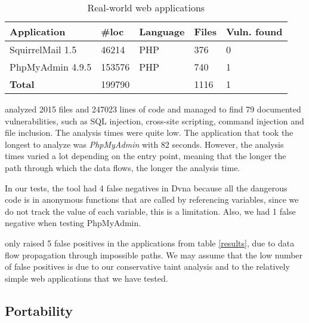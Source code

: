 \begin{table*}[htbp]
    \caption{Real-world web applications}
    \begin{center}
        \begin{tabular}{|l|| l | l  |l | l |}
            \hline
            \textbf{Application}  & \textbf{\#loc}      & \textbf{Language}      & \textbf{Files}     & \textbf{Vuln. found} \\ [0.5ex] 
            \hline\hline   
             SquirrelMail 1.5     & 46214     & PHP        & 376         & 0 \\ 
            \hline
             PhpMyAdmin 4.9.5     & 153576    & PHP        & 740        & 1 \\  [0.5ex]    
            \hline\hline   
            \textbf{Total}        & 199790 &              &  1116 &  1 \\
            \hline
        \end{tabular}
    \label{results1}
    \end{center}
\end{table*}


\toolname{} analyzed 2015 files and 247023 lines of code and managed to find 79 documented vulnerabilities, such as SQL injection, cross-site scripting, command injection and file inclusion. The analysis times were quite low. The application that took the longest to analyze was \textit{PhpMyAdmin} with 82 seconds. However, the analysis times varied a lot depending on the entry point, meaning that the longer the path through which the data flows, the longer the analysis time.

In our tests, the tool had 4 false negatives in Dvna because all the dangerous code is in anonymous functions that are called by referencing variables, since we do not track the value of each variable, this is a limitation. Also, we had 1 false negative when testing PhpMyAdmin.

\toolname{} only raised 5 false positives in the applications from table \ref{results}, due to data flow propagation through impossible paths. We may assume that the low number of false positives is due to our conservative taint analysis and to the relatively simple web applications that we have tested.


\subsection{Portability}

